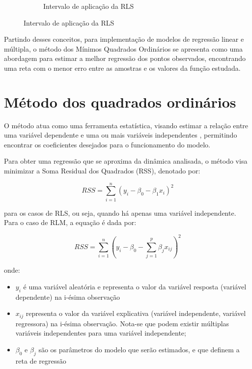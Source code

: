 \begin{figure}[H]
\begin{subfigure}{0.4\textwidth}
		\caption{Intervalo de aplicação da RLS}
		\label{fig:intervalo_aplicacao_rls}
	\end{subfigure}
	\label{fig:comportamento_regressao_linear}
\end{figure}

Partindo desses conceitos, para implementação de modelos de regressão linear e múltipla, o método dos Mínimos Quadrados Ordinários se apresenta como uma abordagem para estimar a melhor regressão dos pontos observados, encontrando uma reta com o menor erro entre as amostras e os valores da função estudada.

\section{Método dos quadrados ordinários}

O método  atua como uma ferramenta estatística, visando estimar a relação entre uma variável dependente e uma ou mais variáveis independentes \cite{Alkama2020}, permitindo encontrar os coeficientes desejados para o funcionamento do modelo.

Para obter uma regressão que se aproxima da dinâmica analisada, o método visa minimizar a Soma Residual dos Quadrados (RSS), denotado por:

\begin{equation}
	RSS = \sum_{i=1}^{n} \left(y_i - \beta_0 - \beta_1x_{i}\right)^2
\end{equation}

para os casos de RLS, ou seja, quando há apenas uma variável independente. Para o caso de RLM, a equação é dada por:

\begin{equation}
    RSS = \sum_{i=1}^{n} \left(y_i - \beta_0 - \sum_{j=1}^{p}\beta_jx_{ij}\right)^2
\end{equation}

onde:

\begin{itemize}
    \item $y_i$ é uma variável aleatória e representa o valor da variável resposta (variável dependente) na i-ésima observação
    \item $x_{ij}$ representa o valor da variável explicativa (variável independente, variável regressora) na i-ésima observação. Nota-se que podem existir múltiplas variáveis independentes para uma variável independente; 
    \item $\beta_{0}$ e $\beta_{j}$ são os parâmetros do modelo que serão estimados, e que definem a reta de regressão
\end{itemize}

